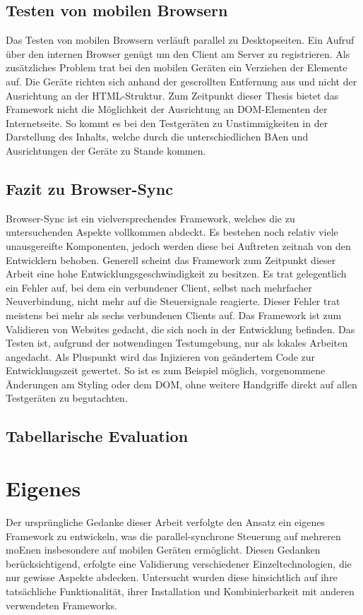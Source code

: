 	\subsection{Testen von mobilen Browsern}
	Das Testen von mobilen Browsern verläuft parallel zu Desktopseiten. Ein Aufruf über den internen Browser genügt um den Client am Server zu registrieren. Als zusätzliches Problem trat bei den mobilen Geräten ein Verziehen der Elemente auf. Die Geräte richten sich anhand der gescrollten Entfernung aus und nicht der Ausrichtung an der \Gls{HTML}-Struktur. Zum Zeitpunkt dieser Thesis bietet das \Gls{Framework} nicht die Möglichkeit der Ausrichtung an \Gls{DOM}-Elementen der Internetseite. So kommt es bei den Testgeräten zu Unstimmigkeiten in der Darstellung des Inhalts, welche durch die unterschiedlichen \Gls{BA}en und Ausrichtungen der Geräte zu Stande kommen.
	
	\subsection{Fazit zu Browser-Sync}
	Browser-Sync ist ein vielversprechendes \Gls{Framework}, welches die zu untersuchenden Aspekte vollkommen abdeckt. Es bestehen noch relativ viele unausgereifte Komponenten, jedoch werden diese bei Auftreten zeitnah von den Entwicklern behoben. Generell scheint das \Gls{Framework} zum Zeitpunkt dieser Arbeit eine hohe Entwicklungsgeschwindigkeit zu besitzen. Es trat gelegentlich ein Fehler auf, bei dem ein verbundener Client, selbst nach mehrfacher Neuverbindung, nicht mehr auf die Steuersignale reagierte. Dieser Fehler trat meistens bei mehr als sechs verbundenen Clients auf. Das \Gls{Framework} ist zum Validieren von Websites gedacht, die sich noch in der Entwicklung befinden. Das Testen ist, aufgrund der notwendingen Testumgebung, nur als lokales Arbeiten angedacht. Als Pluspunkt wird das Injizieren von geändertem Code zur Entwicklungszeit gewertet. So ist es zum Beispiel möglich, vorgenommene Änderungen am Styling oder dem \Gls{DOM}, ohne weitere Handgriffe direkt auf allen Testgeräten zu begutachten.
	
	\subsection{Tabellarische Evaluation}
	
	
	\section{Eigenes }
	Der ursprüngliche Gedanke dieser Arbeit verfolgte den Ansatz ein eigenes \Gls{Framework} zu entwickeln, was die \gls{parallel-synchron}e Steuerung auf mehreren \Gls{moEn}en insbesondere auf mobilen Geräten ermöglicht. Diesen Gedanken berücksichtigend, erfolgte eine Validierung verschiedener Einzeltechnologien, die nur gewisse Aspekte abdecken. Untersucht wurden diese hinsichtlich auf ihre tatsächliche Funktionalität, ihrer Installation und Kombinierbarkeit mit anderen verwendeten \Gls{Framework}s.
	
